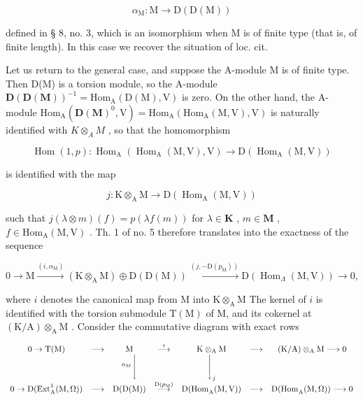 \[
\alpha_ {\mathrm{M}}: \mathrm{M} \longrightarrow \mathrm{D} (\mathrm{D(M)})
\]

defined in § 8, no. 3, which is an isomorphism when M is of finite type (that is, of finite length). In this case we recover the situation of loc. cit.

Let us return to the general case, and suppose the A-module M is of finite type. Then D(M) is a torsion module, so the A-module \(\mathbf{D}(\mathbf{D}(\mathbf{M}))^{-1} = \mathrm{Hom}_{\mathrm{A}}(\mathrm{D}(\mathrm{M}), \mathrm{V})\) is zero. On the other hand, the A-module \(\mathrm{Hom}_{\mathrm{A}}(\mathbf{D}(\mathbf{M})^{0}, \mathrm{V}) = \mathrm{Hom}_{\mathrm{A}}(\mathrm{Hom}_{\mathrm{A}}(\mathrm{M}, \mathrm{V}), \mathrm{V})\) is naturally identified with \(K \otimes_{A} M\) , so that the homomorphism

\[
\operatorname{Hom} (1, p): \operatorname{Hom} _ {\mathrm{A}} (\operatorname{Hom} _ {\mathrm{A}} (\mathrm{M}, \mathrm{V}), \mathrm{V}) \longrightarrow \mathrm{D} (\operatorname{Hom} _ {\mathrm{A}} (\mathrm{M}, \mathrm{V}))
\]

is identified with the map

\[
j: \mathrm{K} \otimes_ {\mathrm{A}} \mathrm{M} \longrightarrow \mathrm{D} (\operatorname{Hom} _ {\mathrm{A}} (\mathrm{M}, \mathrm{V}))
\]

such that \(j(\lambda \otimes m)(f) = p(\lambda f(m))\) for \(\lambda \in \mathbf{K}\) , \(m \in \mathbf{M}\) , \(f \in \mathrm{Hom}_{\mathrm{A}}(\mathrm{M},\mathrm{V})\) . Th. 1 of no. 5 therefore translates into the exactness of the sequence

\[
0 \longrightarrow \mathrm{M} \xrightarrow {(i , \alpha_ {\mathrm{M}})} (\mathrm{K} \otimes_ {\mathrm{A}} \mathrm{M}) \oplus \mathrm{D} (\mathrm{D} (\mathrm{M})) \xrightarrow {(j , - \mathrm{D} (p _ {\mathrm{M}}))} \mathrm{D} (\operatorname{Hom} _ {\Lambda} (\mathrm{M}, \mathrm{V})) \longrightarrow 0,
\]

where \(i\) denotes the canonical map from M into \(\mathrm{K} \otimes_{\mathrm{A}} \mathrm{M}\) The kernel of \(i\) is identified with the torsion submodule \(\mathrm{T(M)}\) of M, and its cokernel at \((\mathrm{K/A}) \otimes_{\mathrm{A}} \mathrm{M}\) . Consider the commutative diagram with exact rows

\[
\begin{array}{c c c c c c c} 0 \to \mathrm{T(M)} & \longrightarrow & \mathrm{M} & \stackrel {{\imath}} {{\longrightarrow}} & \mathrm {K\otimes_ {A} M} & \longrightarrow & (\mathrm{K/A}) \otimes_ {\mathrm{A}} \mathrm{M} \longrightarrow 0 \\ & & ^ {\alpha_ {\mathrm{M}}} \Bigg \downarrow & & \Bigg \downarrow_ {j} \\ 0 \to \mathrm{D(Ext} _ {\mathrm{A}} ^ {1} (\mathrm{M}, \Omega)) & \longrightarrow & \mathrm{D(D(M))} & \stackrel {{\mathrm{D} (p _ {\mathrm{M}})}} {{\longrightarrow}} & \mathrm{D(Hom} _ {\mathrm{A}} (\mathrm{M}, \mathrm{V})) & \longrightarrow & \mathrm{D(Hom} _ {\mathrm{A}} (\mathrm{M}, \Omega)) \longrightarrow 0 \end{array}
\]

